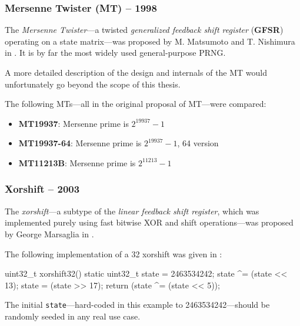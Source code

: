 \subsubsection[Mersenne Twister (MT) -- 1998]{Mersenne Twister (MT) -- 1998} \label{subsubsec:mt}

    The \emph{Mersenne Twister}---a twisted \emph{generalized feedback shift register} (\textbf{GFSR}) operating on a state matrix---was proposed by M. Matsumoto and T. Nishimura in \cite{Matsumoto:1998}. It is by far the most widely used general-purpose PRNG.

    A more detailed description of the design and internals of the MT would unfortunately go beyond the scope of this thesis.

    The following MTs---all in the original proposal of MT---were compared:
    \begin{itemize}
        \itemsep0em
        \item \textbf{MT19937}: Mersenne prime is $2^{19937} - 1$
        \item \textbf{MT19937-64}: Mersenne prime is $2^{19937} - 1$, \SI{64}{\bit} version
        \item \textbf{MT11213B}: Mersenne prime is $2^{11213} - 1$
    \end{itemize}

\subsubsection[Xorshift -- 2003]{Xorshift -- 2003} \label{subsubsec:xorshift}

    The \emph{xorshift}---a subtype of the \emph{linear feedback shift register}, which was implemented purely using fast bitwise XOR and shift operations---was proposed by George Marsaglia in \cite{Marsaglia:2003}.

    The following implementation of a \SI{32}{\bit} xorshift was given in \cite{Marsaglia:2003}:
\begin{@empty}
    \lstset{
        language = [ISO]C++
    }
\begin{centeredshadowboxlisting}
uint32_t xorshift32() {
    static uint32_t state = 2463534242;
    state ^= (state << 13);
    state = (state >> 17);
    return (state ^= (state << 5));
}
\end{centeredshadowboxlisting}
\end{@empty}
    \textcolor{black!75}{The initial \lstinline|state|---hard-coded in this example to 2463534242---should be randomly seeded in any real use case.}

